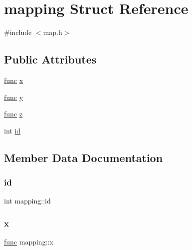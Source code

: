 \hypertarget{structmapping}{}\section{mapping Struct Reference}
\label{structmapping}


{\ttfamily \#include $<$map.\+h$>$}

\subsection*{Public Attributes}
\begin{DoxyCompactItemize}
\item 
\mbox{\hyperlink{base_8h_a6dd92a1df4b8b4a265cd65db9907ebe5}{func}} \mbox{\hyperlink{structmapping_a7f2f045bb06a07f36d6366ea3d801030}{x}}
\item 
\mbox{\hyperlink{base_8h_a6dd92a1df4b8b4a265cd65db9907ebe5}{func}} \mbox{\hyperlink{structmapping_ad35765a69218ccf1149aaf7bac65529a}{y}}
\item 
\mbox{\hyperlink{base_8h_a6dd92a1df4b8b4a265cd65db9907ebe5}{func}} \mbox{\hyperlink{structmapping_a72e48178353662ca496d1a19779370c5}{z}}
\item 
int \mbox{\hyperlink{structmapping_a58ce8ec1609a05759dd07e26fb57b7a7}{id}}
\end{DoxyCompactItemize}


\subsection{Member Data Documentation}
\mbox{\label{structmapping_a58ce8ec1609a05759dd07e26fb57b7a7}} 
\subsubsection{\texorpdfstring{id}{id}}
{\footnotesize\ttfamily int mapping\+::id}

\mbox{\label{structmapping_a7f2f045bb06a07f36d6366ea3d801030}} 
\subsubsection{\texorpdfstring{x}{x}}
{\footnotesize\ttfamily \mbox{\hyperlink{base_8h_a6dd92a1df4b8b4a265cd65db9907ebe5}{func}} mapping\+::x}

